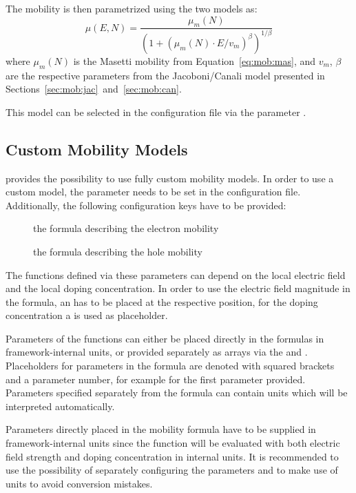 The mobility is then parametrized using the two models as:
\begin{equation}
    \label{eq:mob:mascan}
    \mu (E, N) = \frac{\mu_{m}(N)}{\left(1 + \left(\mu_{m}(N) \cdot E / v_{m} \right)^{\beta} \right)^{1 / \beta}}
\end{equation}
where $\mu_{m}(N)$ is the Masetti mobility from Equation~\eqref{eq:mob:mas}, and $v_{m}$, $\beta$ are the respective parameters from the Jacoboni/Canali model presented in Sections~\ref{sec:mob:jac}~and~\ref{sec:mob:can}.

This model can be selected in the configuration file via the parameter .

\subsection{Custom Mobility Models}
\apsq provides the possibility to use fully custom mobility models.
In order to use a custom model, the parameter  needs to be set in the configuration file.
Additionally, the following configuration keys have to be provided:
\begin{description}
    \item[] the formula describing the electron mobility
    \item[] the formula describing the hole mobility
\end{description}

The functions defined via these parameters can depend on the local electric field and the local doping concentration.
In order to use the electric field magnitude in the formula, an  has to be placed at the respective position, for the doping concentration a  is used as placeholder.

Parameters of the functions can either be placed directly in the formulas in framework-internal units, or provided separately as arrays via the  and .
Placeholders for parameters in the formula are denoted with squared brackets and a parameter number, for example \parameter{[0]} for the first parameter provided.
Parameters specified separately from the formula can contain units which will be interpreted automatically.

\begin{warning}
Parameters directly placed in the mobility formula have to be supplied in framework-internal units since the function will be evaluated with both electric field strength and doping concentration in internal units.
It is recommended to use the possibility of separately configuring the parameters and to make use of units to avoid conversion mistakes.
\end{warning}

